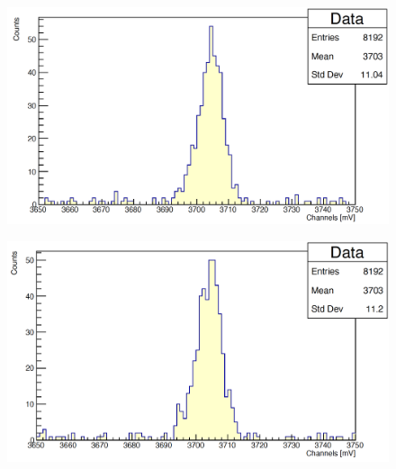 \documentclass[a4paper,10pt]{article}
\begin{document}
\begin{figure}[H]
    \centering
    \includegraphics[scale=0.45]{appendice/spettri/CoA_1460_16}
\end{figure}
\begin{figure}[H]
    \centering
    \includegraphics[scale=0.45]{appendice/spettri/CoA_1460_20}
\end{figure}
\end{document}
